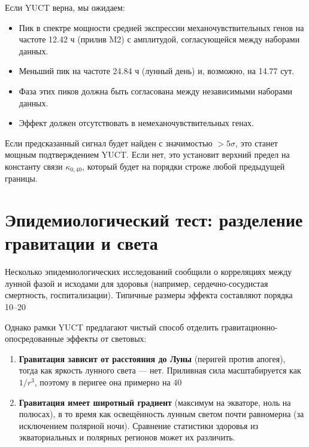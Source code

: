 \documentclass[12pt,a4paper]{article}
\theoremstyle{remark}
\begin{document}
	Если YUCT верна, мы ожидаем:
	\begin{itemize}
		\item Пик в спектре мощности средней экспрессии механочувствительных генов на частоте 12.42 ч (прилив M2) с амплитудой, согласующейся между наборами данных.
		\item Меньший пик на частоте 24.84 ч (лунный день) и, возможно, на 14.77 сут.
		\item Фаза этих пиков должна быть согласована между независимыми наборами данных.
		\item Эффект должен отсутствовать в немеханочувствительных генах.
	\end{itemize}
	
	Если предсказанный сигнал будет найден с значимостью \(> 5\sigma\), это станет мощным подтверждением YUCT. Если нет, это установит верхний предел на константу связи \(\kappa_{0,40}\), который будет на порядки строже любой предыдущей границы.
	
	\section{Эпидемиологический тест: разделение гравитации и света}
	\label{sec:epidemiology}
	
	Несколько эпидемиологических исследований сообщили о корреляциях между лунной фазой и исходами для здоровья (например, сердечно-сосудистая смертность, госпитализации). Типичные размеры эффекта составляют порядка 10–20%
	
	Однако рамки YUCT предлагают чистый способ отделить гравитационно-опосредованные эффекты от световых:
	
	\begin{enumerate}
		\item \textbf{Гравитация зависит от расстояния до Луны} (перигей против апогея), тогда как яркость лунного света — нет. Приливная сила масштабируется как \(1/r^3\), поэтому в перигее она примерно на 40%
		\item \textbf{Гравитация имеет широтный градиент} (максимум на экваторе, ноль на полюсах), в то время как освещённость лунным светом почти равномерна (за исключением полярной ночи). Сравнение статистики здоровья из экваториальных и полярных регионов может их различить.
	\end{enumerate}
	
\end{document}
